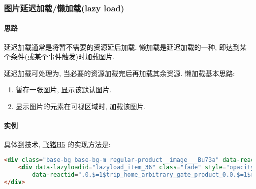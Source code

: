 \subsubsection{图片延迟加载/懒加载(lazy
load)}\label{ux56feux7247ux5ef6ux8fdfux52a0ux8f7dux61d2ux52a0ux8f7dlazy-load}

\paragraph{思路}\label{ux601dux8def}

延迟加载通常是将暂不需要的资源延后加载. 懒加载是延迟加载的一种,
即达到某个条件(或某个事件触发)时加载图片.

延迟加载可处理为, 当必要的资源加载完后再加载其余资源. 懒加载基本思路:

\begin{enumerate}
\def\labelenumi{\arabic{enumi}.}
\tightlist
\item
  暂存一张图片, 显示该默认图片.
\item
  显示图片的元素在可视区域时, 加载该图片.
\end{enumerate}

\paragraph{实例}\label{ux5b9eux4f8b}

具体到技术,
\href{https://h5.m.taobao.com/trip/home/index.html?_projVer=0.1.125}{飞猪H5}
的实现方法是:

\begin{lstlisting}[language=HTML]
<div class="base-bg base-bg-m regular-product__image___Bu73a" data-reactid=".0.$=1$trip_home_arbitrary_gate_product_0.0.$=1$regular_item_1.0.$=10">
    <div data-lazyloadid="lazyload_item_36" class="fade" style="opacity: 1;background-image: url(&quot;//gw.alicdn.com/tips/i3/638737216/TB2vvwZtVXXXXX0XXXXXXXXXXXX_!!638737216.jpg_400x400q75.jpg_.webp&quot;);"
        data-reactid=".0.$=1$trip_home_arbitrary_gate_product_0.0.$=1$regular_item_1.0.$=10.$=11" data-imageloaded="true"></div>
</div>
\end{lstlisting}

